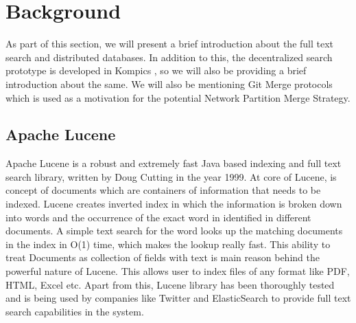 \documentclass[12pt,a4paper,twoside,openright]{book}
\begin{document}
\chapter{Background}
\label{chap:background}

As part of this section, we will present a brief introduction about the full text search and distributed databases. In addition to this, the decentralized search prototype is developed in Kompics \cite{kompics}, so we will also be providing a brief introduction about the same. We will also be mentioning Git Merge protocols which is used as a motivation for the potential Network Partition Merge Strategy.


\section{Apache Lucene}

Apache Lucene \cite{lucene} is a robust and extremely fast Java based indexing and full text search library, written by Doug Cutting in the year 1999. At core of Lucene, is concept of documents which are containers of information that needs to be indexed. Lucene creates inverted index in which the information is broken down into words and the occurrence of the exact word in identified in different documents. A simple text search for the word looks up the matching documents in the index in O(1) time, which makes the lookup really fast. This ability to treat Documents as collection of fields with text is main reason behind the powerful nature of Lucene. This allows user to index files of any format like PDF, HTML, Excel etc. 
Apart from this, Lucene library has been thoroughly tested and is being used by companies like Twitter and ElasticSearch \cite{elasticsearch} to provide full text search capabilities in the system.
\end{document}
